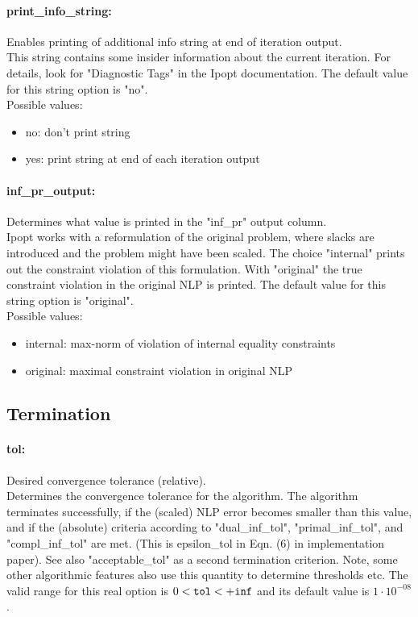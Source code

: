 \paragraph{print\_info\_string:}\label{opt:print_info_string} Enables printing of additional info string at end of iteration output. \\
 This string contains some insider information
about the current iteration.  For details, look
for "Diagnostic Tags" in the Ipopt documentation. The default value for this string option is "no".
\\ 
Possible values:
\begin{itemize}
   \item no: don't print string
   \item yes: print string at end of each iteration output
\end{itemize}

\paragraph{inf\_pr\_output:}\label{opt:inf_pr_output} Determines what value is printed in the "inf\_pr" output column. \\
 Ipopt works with a reformulation of the original
problem, where slacks are introduced and the
problem might have been scaled.  The choice
"internal" prints out the constraint violation of
this formulation. With "original" the true
constraint violation in the original NLP is
printed. The default value for this string option is "original".
\\ 
Possible values:
\begin{itemize}
   \item internal: max-norm of violation of internal equality
constraints
   \item original: maximal constraint violation in original NLP
\end{itemize}

\subsection{Termination}

\paragraph{tol:}\label{opt:tol} Desired convergence tolerance (relative). \\
 Determines the convergence tolerance for the
algorithm.  The algorithm terminates
successfully, if the (scaled) NLP error becomes
smaller than this value, and if the (absolute)
criteria according to "dual\_inf\_tol",
"primal\_inf\_tol", and "compl\_inf\_tol" are
met.  (This is epsilon\_tol in Eqn. (6) in
implementation paper).  See also
"acceptable\_tol" as a second termination
criterion.  Note, some other algorithmic features
also use this quantity to determine thresholds
etc. The valid range for this real option is 
$0 <  {\tt tol } <  {\tt +inf}$
and its default value is $1 \cdot 10^{-08}$.


